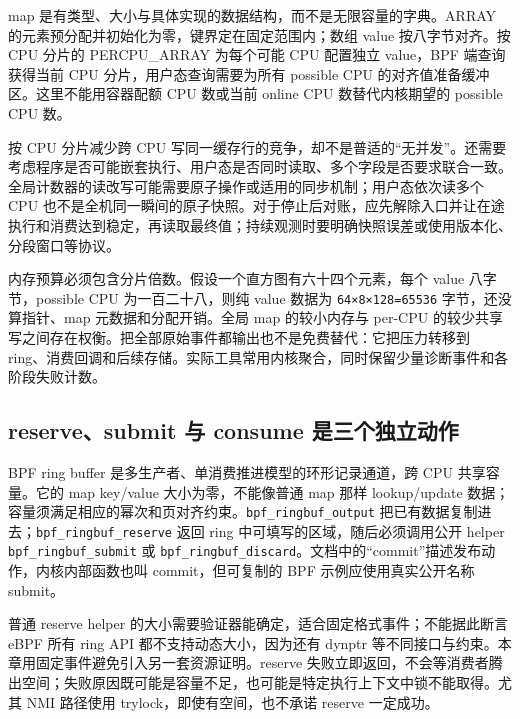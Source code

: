 \documentclass[UTF8,fontset=fandol,openany,11pt]{ctexbook}
\begin{document}
map 是有类型、大小与具体实现的数据结构，而不是无限容量的字典。ARRAY 的元素预分配并初始化为零，键界定在固定范围内；数组 value 按八字节对齐。按 CPU 分片的 PERCPU\_\allowbreak{}ARRAY 为每个可能 CPU 配置独立 value，BPF 端查询获得当前 CPU 分片，用户态查询需要为所有 possible CPU 的对齐值准备缓冲区。这里不能用容器配额 CPU 数或当前 online CPU 数替代内核期望的 possible CPU 数。\cite{eb-map-array-doc}\cite{eb-map-array-code}\cite{eb-attach-api}


按 CPU 分片减少跨 CPU 写同一缓存行的竞争，却不是普适的“无并发”。还需要考虑程序是否可能嵌套执行、用户态是否同时读取、多个字段是否要求联合一致。全局计数器的读改写可能需要原子操作或适用的同步机制；用户态依次读多个 CPU 也不是全机同一瞬间的原子快照。对于停止后对账，应先解除入口并让在途执行和消费达到稳定，再读取最终值；持续观测时要明确快照误差或使用版本化、分段窗口等协议。\cite{eb-map-array-doc}\cite{eb-map-array-code}\cite{eb-ring-consume}


内存预算必须包含分片倍数。假设一个直方图有六十四个元素，每个 value 八字节，possible CPU 为一百二十八，则纯 value 数据为 \texttt{64×8×128=65536} 字节，还没算指针、map 元数据和分配开销。全局 map 的较小内存与 per-CPU 的较少共享写之间存在权衡。把全部原始事件都输出也不是免费替代：它把压力转移到 ring、消费回调和后续存储。实际工具常用内核聚合，同时保留少量诊断事件和各阶段失败计数。\cite{eb-map-array-code}\cite{eb-ring-doc}


\subsection{reserve、submit 与 consume 是三个独立动作}

BPF ring buffer 是多生产者、单消费推进模型的环形记录通道，跨 CPU 共享容量。它的 map key/value 大小为零，不能像普通 map 那样 lookup/update 数据；容量须满足相应的幂次和页对齐约束。\texttt{bpf\_\allowbreak{}ringbuf\_\allowbreak{}output} 把已有数据复制进去；\texttt{bpf\_\allowbreak{}ringbuf\_\allowbreak{}reserve} 返回 ring 中可填写的区域，随后必须调用公开 helper \texttt{bpf\_\allowbreak{}ringbuf\_\allowbreak{}submit} 或 \texttt{bpf\_\allowbreak{}ringbuf\_\allowbreak{}discard}。文档中的“commit”描述发布动作，内核内部函数也叫 commit，但可复制的 BPF 示例应使用真实公开名称 submit。\cite{eb-ring-doc}\cite{eb-ring-code}


普通 reserve helper 的大小需要验证器能确定，适合固定格式事件；不能据此断言 eBPF 所有 ring API 都不支持动态大小，因为还有 dynptr 等不同接口与约束。本章用固定事件避免引入另一套资源证明。reserve 失败立即返回，不会等消费者腾出空间；失败原因既可能是容量不足，也可能是特定执行上下文中锁不能取得。尤其 NMI 路径使用 trylock，即使有空间，也不承诺 reserve 一定成功。\cite{eb-ring-doc}\cite{eb-ring-code}
\end{document}
